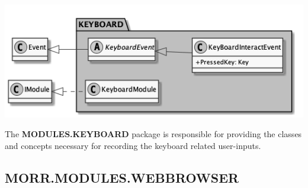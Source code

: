 \begin{center}
    \includegraphics[width=1.0\textwidth]{resources/Packages/MODULES_KEYBOARD.png}
\end{center}

The \textbf{MODULES.KEYBOARD} package is responsible for providing the classes and concepts necessary for recording the keyboard related user-inputs.

\begin{packclass}
\end{packclass}

\newpage
\subsection*{MORR.MODULES.WEBBROWSER}

